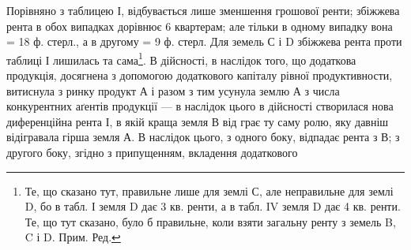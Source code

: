 Порівняно з таблицею І, відбувається лише зменшення грошової ренти;
збіжжева рента в обох випадках дорівнює 6 квартерам; але тільки в одному
випадку вона = 18 ф. стерл., а в другому = 9 ф. стерл. Для земель С і D
збіжжева рента проти таблиці І лишилась та сама\footnote*{
Те, що сказано тут, правильне лише для землі С, але неправильне для землі D, бо в табл. І земля
D дає 3 кв. ренти, а в табл. IV земля D дає 4 кв. ренти. Те, що тут сказано, було б правильне, коли
взяти загальну ренту з земель B, C і D. Прим. Ред.
}. В дійсності, в наслідок
того, що додаткова продукція, досягнена з допомогою додаткового капіталу рівної
продуктивности, витиснула з ринку продукт А і разом з тим усунула землю А
з числа конкурентних аґентів продукції — в наслідок цього в дійсності створилася
нова диференційна рента І, в якій краща земля В від грає ту саму ролю,
яку давніш відігравала гірша земля А. В наслідок цього, з одного боку, відпадає
рента з В; з другого боку, згідно з припущенням, вкладення додаткового
\parbreak{}  %
